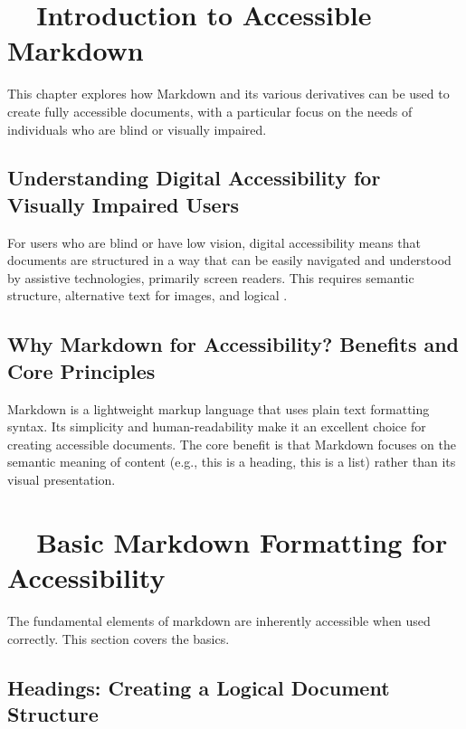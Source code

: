 \label{chap:markdown-accessibility}

\section{~~Introduction to Accessible Markdown}
\label{sec:intro-accessible-markdown}
This chapter explores how Markdown and its various derivatives can be used to create fully accessible documents, with a particular focus on the needs of individuals who are blind or visually impaired.

\subsection{Understanding Digital Accessibility for Visually Impaired Users}
\label{subsec:digital-accessibility-vi}
For users who are blind or have low vision, digital accessibility means that documents are structured in a way that can be easily navigated and understood by assistive technologies, primarily screen readers. This requires semantic structure, alternative text for images, and logical .

\subsection{Why Markdown for Accessibility? Benefits and Core Principles}
\label{subsec:why-markdown-for-accessibility}
Markdown is a lightweight markup language that uses plain text formatting syntax. Its simplicity and human-readability make it an excellent choice for creating accessible documents. The core benefit is that Markdown focuses on the semantic meaning of content (e.g., this is a heading, this is a list) rather than its visual presentation.

\section{~~Basic Markdown Formatting for Accessibility}
\label{sec:basic-markdown-formatting}
The fundamental elements of \gls{markdown} are inherently accessible when used correctly. This section covers the basics.

\subsection{Headings: Creating a Logical Document Structure}
\label{subsec:markdown-headings}
